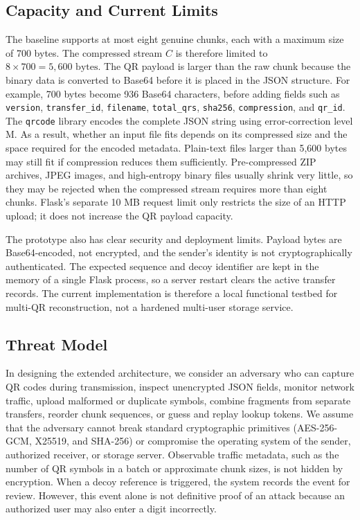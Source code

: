 \documentclass[conference]{IEEEtran}
\begin{document}
\subsection{Capacity and Current Limits}
The baseline supports at most eight genuine chunks, each with a maximum size of 700 bytes. The compressed stream $C$ is therefore limited to $8 \times 700 = 5{,}600\text{ bytes}$. The QR payload is larger than the raw chunk because the binary data is converted to Base64 before it is placed in the JSON structure. For example, 700 bytes become 936 Base64 characters, before adding fields such as \texttt{version}, \texttt{transfer\_id}, \texttt{filename}, \texttt{total\_qrs}, \texttt{sha256}, \texttt{compression}, and \texttt{qr\_id}. The \texttt{qrcode} library encodes the complete JSON string using error-correction level M. As a result, whether an input file fits depends on its compressed size and the space required for the encoded metadata. Plain-text files larger than 5,600 bytes may still fit if compression reduces them sufficiently. Pre-compressed ZIP archives, JPEG images, and high-entropy binary files usually shrink very little, so they may be rejected when the compressed stream requires more than eight chunks. Flask's separate 10 MB request limit only restricts the size of an HTTP upload; it does not increase the QR payload capacity.

The prototype also has clear security and deployment limits. Payload bytes are Base64-encoded, not encrypted, and the sender's identity is not cryptographically authenticated. The expected sequence and decoy identifier are kept in the memory of a single Flask process, so a server restart clears the active transfer records. The current implementation is therefore a local functional testbed for multi-QR reconstruction, not a hardened multi-user storage service.

\subsection{Threat Model}
In designing the extended architecture, we consider an adversary who can capture QR codes during transmission, inspect unencrypted JSON fields, monitor network traffic, upload malformed or duplicate symbols, combine fragments from separate transfers, reorder chunk sequences, or guess and replay lookup tokens. We assume that the adversary cannot break standard cryptographic primitives (AES-256-GCM, X25519, and SHA-256) or compromise the operating system of the sender, authorized receiver, or storage server. Observable traffic metadata, such as the number of QR symbols in a batch or approximate chunk sizes, is not hidden by encryption. When a decoy reference is triggered, the system records the event for review. However, this event alone is not definitive proof of an attack because an authorized user may also enter a digit incorrectly.
\end{document}
